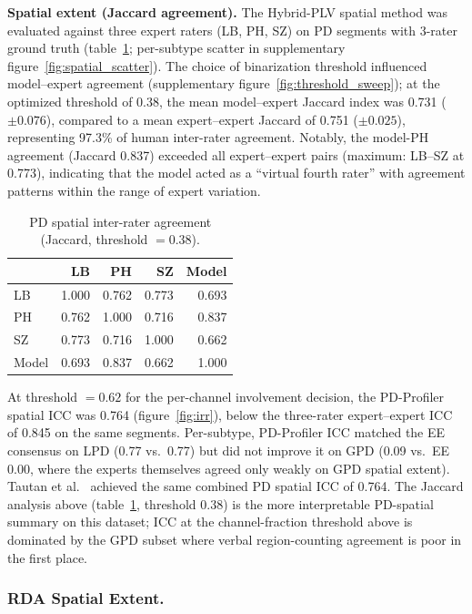 \documentclass{iopjournal}
\begin{document}
\textbf{Spatial extent (Jaccard agreement).} The Hybrid-PLV spatial method was evaluated against three expert raters (LB, PH, SZ) on PD segments with 3-rater ground truth (table~\ref{tab:spatial_jaccard}; per-subtype scatter in supplementary figure~\ref{fig:spatial_scatter}). The choice of binarization threshold influenced model--expert agreement (supplementary figure~\ref{fig:threshold_sweep}); at the optimized threshold of 0.38, the mean model--expert Jaccard index was 0.731 ($\pm 0.076$), compared to a mean expert--expert Jaccard of 0.751 ($\pm 0.025$), representing 97.3\% of human inter-rater agreement. Notably, the model-PH agreement (Jaccard 0.837) exceeded all expert--expert pairs (maximum: LB--SZ at 0.773), indicating that the model acted as a ``virtual fourth rater'' with agreement patterns within the range of expert variation.

\begin{table}[t]
\caption{PD spatial inter-rater agreement (Jaccard, threshold $= 0.38$).}
\centering
\begin{tabular}{l r r r r}
\hline
 & LB & PH & SZ & Model \\
\hline
LB & 1.000 & 0.762 & 0.773 & 0.693 \\
PH & 0.762 & 1.000 & 0.716 & 0.837 \\
SZ & 0.773 & 0.716 & 1.000 & 0.662 \\
Model & 0.693 & 0.837 & 0.662 & 1.000 \\
\hline
\end{tabular}
\label{tab:spatial_jaccard}
\end{table}

At threshold $= 0.62$ for the per-channel involvement decision, the PD-Profiler spatial ICC was 0.764 (figure~\ref{fig:irr}), below the three-rater expert--expert ICC of 0.845 on the same segments. Per-subtype, PD-Profiler ICC matched the EE consensus on LPD (0.77 vs.\ 0.77) but did not improve it on GPD (0.09 vs.\ EE 0.00, where the experts themselves agreed only weakly on GPD spatial extent). Tautan et al.~\cite{tautan2025} achieved the same combined PD spatial ICC of 0.764. The Jaccard analysis above (table~\ref{tab:spatial_jaccard}, threshold $0.38$) is the more interpretable PD-spatial summary on this dataset; ICC at the channel-fraction threshold above is dominated by the GPD subset where verbal region-counting agreement is poor in the first place.

\subsubsection{RDA Spatial Extent.}
\end{document}
